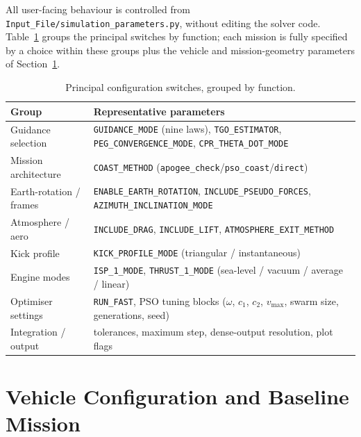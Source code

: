 All user-facing behaviour is controlled from
\texttt{Input\_File/simulation\_parameters.py}, without editing the solver code.
Table~\ref{tab:config} groups the principal switches by function; each mission is
fully specified by a choice within these groups plus the vehicle and
mission-geometry parameters of Section~\ref{sec:vehicle}.

\begin{table}[htbp]
  \centering
  \caption{Principal configuration switches, grouped by function.}
  \label{tab:config}
  \small
  \begin{tabular}{l l}
    \toprule
    \textbf{Group} & \textbf{Representative parameters} \\
    \midrule
    Guidance selection      & \texttt{GUIDANCE\_MODE} (nine laws),
                              \texttt{TGO\_ESTIMATOR}, \texttt{PEG\_CONVERGENCE\_MODE},
                              \texttt{CPR\_THETA\_DOT\_MODE} \\
    Mission architecture    & \texttt{COAST\_METHOD}
                              (\texttt{apogee\_check}/\texttt{pso\_coast}/\texttt{direct}) \\
    Earth-rotation / frames & \texttt{ENABLE\_EARTH\_ROTATION},
                              \texttt{INCLUDE\_PSEUDO\_FORCES},
                              \texttt{AZIMUTH\_INCLINATION\_MODE} \\
    Atmosphere / aero       & \texttt{INCLUDE\_DRAG}, \texttt{INCLUDE\_LIFT},
                              \texttt{ATMOSPHERE\_EXIT\_METHOD} \\
    Kick profile            & \texttt{KICK\_PROFILE\_MODE} (triangular / instantaneous) \\
    Engine modes            & \texttt{ISP\_1\_MODE}, \texttt{THRUST\_1\_MODE}
                              (sea-level / vacuum / average / linear) \\
    Optimiser settings      & \texttt{RUN\_FAST}, PSO tuning blocks
                              ($\omega$, $c_1$, $c_2$, $v_{\max}$, swarm size,
                              generations, seed) \\
    Integration / output    & tolerances, maximum step, dense-output resolution,
                              plot flags \\
    \bottomrule
  \end{tabular}
\end{table}

\section{Vehicle Configuration and Baseline Mission}
\label{sec:vehicle}

